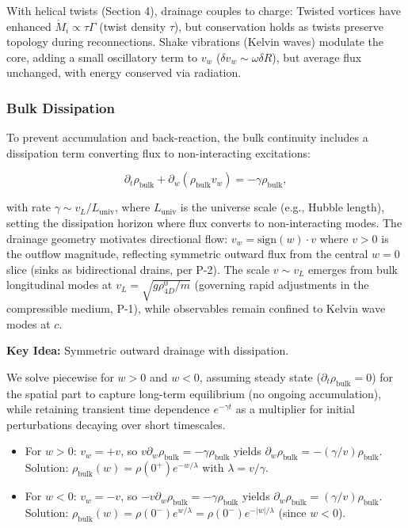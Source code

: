 With helical twists (Section 4), drainage couples to charge: Twisted vortices have enhanced $\dot{M}_i \propto \tau \Gamma$ (twist density $\tau$), but conservation holds as twists preserve topology during reconnections. Shake vibrations (Kelvin waves) modulate the core, adding a small oscillatory term to $v_w$ ($\delta v_w \sim \omega \delta R$), but average flux unchanged, with energy conserved via radiation.

\subsubsection{Bulk Dissipation}
To prevent accumulation and back-reaction, the bulk continuity includes a dissipation term converting flux to non-interacting excitations:

\begin{equation}
\partial_t \rho_{\text{bulk}} + \partial_w (\rho_{\text{bulk}} v_w) = -\gamma \rho_{\text{bulk}},
\end{equation}

with rate $\gamma \sim v_L / L_{\text{univ}}$, where $L_{\text{univ}}$ is the universe scale (e.g., Hubble length), setting the dissipation horizon where flux converts to non-interacting modes. The drainage geometry motivates directional flow: $v_w = \text{sign}(w) \cdot v$ where $v > 0$ is the outflow magnitude, reflecting symmetric outward flux from the central $w=0$ slice (sinks as bidirectional drains, per P-2). The scale $v \sim v_L$ emerges from bulk longitudinal modes at $v_L = \sqrt{g \rho_{4D}^0 / m}$ (governing rapid adjustments in the compressible medium, P-1), while observables remain confined to Kelvin wave modes at $c$.

\textbf{Key Idea:} Symmetric outward drainage with dissipation.

We solve piecewise for $w > 0$ and $w < 0$, assuming steady state ($\partial_t \rho_{\text{bulk}} = 0$) for the spatial part to capture long-term equilibrium (no ongoing accumulation), while retaining transient time dependence $e^{-\gamma t}$ as a multiplier for initial perturbations decaying over short timescales.

\begin{itemize}
\item For $w > 0$: $v_w = +v$, so $v \partial_w \rho_{\text{bulk}} = -\gamma \rho_{\text{bulk}}$ yields $\partial_w \rho_{\text{bulk}} = -(\gamma / v) \rho_{\text{bulk}}$. Solution: $\rho_{\text{bulk}}(w) = \rho(0^+) e^{-w / \lambda}$ with $\lambda = v / \gamma$.
\item For $w < 0$: $v_w = -v$, so $-v \partial_w \rho_{\text{bulk}} = -\gamma \rho_{\text{bulk}}$ yields $\partial_w \rho_{\text{bulk}} = (\gamma / v) \rho_{\text{bulk}}$. Solution: $\rho_{\text{bulk}}(w) = \rho(0^-) e^{w / \lambda} = \rho(0^-) e^{-|w| / \lambda}$ (since $w < 0$).
\end{itemize}

